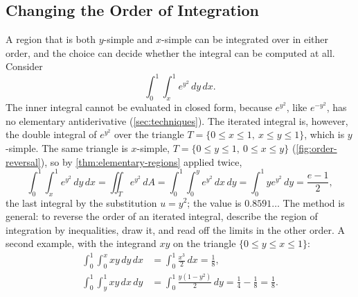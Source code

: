 \subsection{Changing the Order of Integration}

A region that is both $y$-simple and $x$-simple can be integrated over in either order, and the choice can decide whether the integral can be computed at all. Consider
\[
\int_0^1\int_x^1e^{y^2}\,dy\,dx .
\]
The inner integral cannot be evaluated in closed form, because $e^{y^2}$, like $e^{-y^2}$, has no elementary antiderivative (\cref{sec:techniques}). The iterated integral is, however, the double integral of $e^{y^2}$ over the triangle $T=\{0\le x\le1,\ x\le y\le1\}$, which is $y$-simple. The same triangle is $x$-simple, $T=\{0\le y\le1,\ 0\le x\le y\}$ (\cref{fig:order-reversal}), so by \cref{thm:elementary-regions} applied twice,
\[
\int_0^1\int_x^1e^{y^2}\,dy\,dx=\iint_Te^{y^2}\,dA=\int_0^1\int_0^ye^{y^2}\,dx\,dy=\int_0^1ye^{y^2}\,dy=\frac{e-1}2 ,
\]
the last integral by the substitution $u=y^2$; the value is $0.8591\ldots$ The method is general: to reverse the order of an iterated integral, describe the region of integration by inequalities, draw it, and read off the limits in the other order. A second example, with the integrand $xy$ on the triangle $\{0\le y\le x\le1\}$:
\[
\begin{aligned}
\int_0^1\int_0^xxy\,dy\,dx&=\int_0^1\frac{x^3}2\,dx=\frac18 ,\\
\int_0^1\int_y^1xy\,dx\,dy&=\int_0^1\frac{y(1-y^2)}2\,dy=\frac14-\frac18=\frac18 .
\end{aligned}
\]

